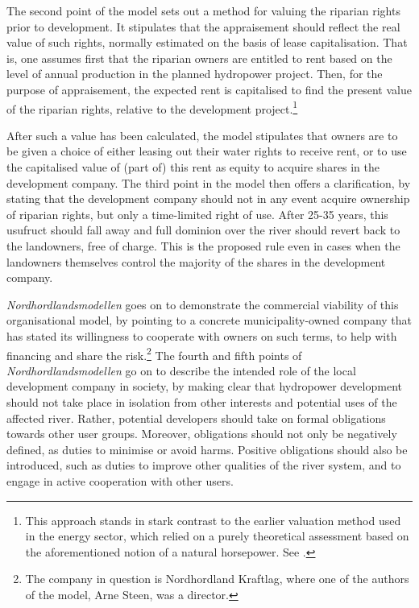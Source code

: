 The second point of the model sets out a method for valuing the riparian rights prior to development. It stipulates that the appraisement should reflect the real value of such rights, normally estimated on the basis of lease capitalisation. That is, one assumes first that the riparian owners are entitled to rent based on the level of annual production in the planned hydropower project. Then, for the purpose of appraisement, the expected rent is capitalised to find the present value of the riparian rights, relative to the development project.\footnote{This approach stands in stark contrast to the earlier valuation method used in the energy sector, which relied on a purely theoretical assessment based on the aforementioned notion of a natural horsepower. See \cite{dyrkolbotn15,hellandsfoss97}.}

After such a value has been calculated, the model stipulates that owners are to be given a choice of either leasing out their water rights to receive rent, or to use the capitalised value of (part of) this rent as equity to acquire shares in the development company. The third point in the model then offers a clarification, by stating that the development company should not in any event acquire ownership of riparian rights, but only a time-limited right of use. After 25-35 years, this usufruct should fall away and full dominion over the river should revert back to the landowners, free of charge. 
This is the proposed rule even in cases when the landowners themselves control the majority of the shares in the development company. 

{\it Nordhordlandsmodellen} goes on to demonstrate the commercial viability of this organisational model, by pointing to a concrete municipality-owned company that has stated its willingness to cooperate with owners on such terms, to help with financing and share the risk.\footnote{The company in question is Nordhordland Kraftlag, where one of the authors of the model, Arne Steen, was a director.}
The fourth and fifth points of {\it Nordhordlandsmodellen} go on to describe the intended role of the local development company in society, by making clear that hydropower development should not take place in isolation from other interests and potential uses of the affected river. Rather, potential developers should take on formal obligations towards other user groups. Moreover, obligations should not only be negatively defined, as duties to minimise or avoid harms. Positive obligations should also be introduced, such as duties to improve other qualities of the river system, and to engage in active cooperation with other users.

